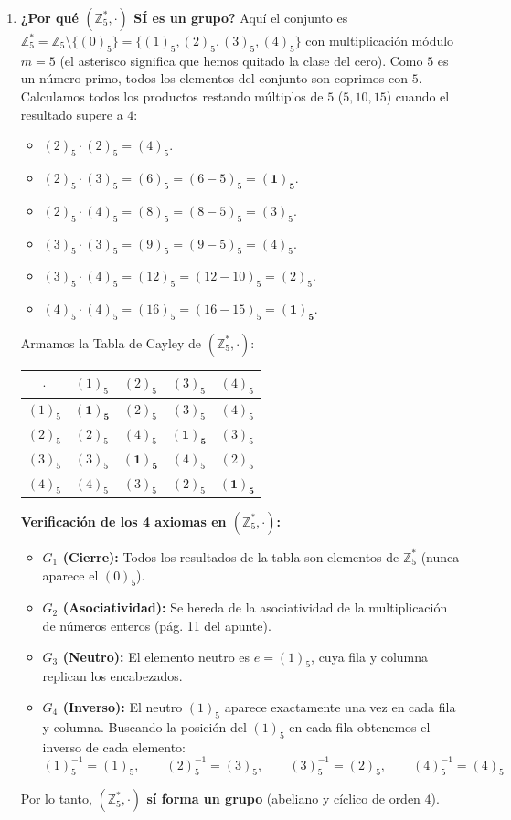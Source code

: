 \documentclass[11pt, a4paper]{article}
\begin{document}
\begin{enumerate}
    \item \textbf{¿Por qué $(\mathbb{Z}_5^*, \cdot)$ SÍ es un grupo?}
    Aquí el conjunto es $\mathbb{Z}_5^* = \mathbb{Z}_5 \setminus \{(0)_5\} = \{(1)_5, (2)_5, (3)_5, (4)_5\}$ con multiplicación módulo $m = 5$ (el asterisco significa que hemos quitado la clase del cero). Como $5$ es un número primo, todos los elementos del conjunto son coprimos con $5$. Calculamos todos los productos restando múltiplos de $5$ ($5, 10, 15$) cuando el resultado supere a $4$:
    \begin{itemize}
        \item $(2)_5 \cdot (2)_5 = (4)_5$.
        \item $(2)_5 \cdot (3)_5 = (6)_5 = (6 - 5)_5 = \mathbf{(1)_5}$.
        \item $(2)_5 \cdot (4)_5 = (8)_5 = (8 - 5)_5 = (3)_5$.
        \item $(3)_5 \cdot (3)_5 = (9)_5 = (9 - 5)_5 = (4)_5$.
        \item $(3)_5 \cdot (4)_5 = (12)_5 = (12 - 10)_5 = (2)_5$.
        \item $(4)_5 \cdot (4)_5 = (16)_5 = (16 - 15)_5 = \mathbf{(1)_5}$.
    \end{itemize}
    Armamos la Tabla de Cayley de $(\mathbb{Z}_5^*, \cdot)$:
    \begin{center}
    \begin{tabular}{c|cccc}
    $\cdot$ & $(1)_5$ & $(2)_5$ & $(3)_5$ & $(4)_5$ \\
    \hline
    $(1)_5$ & $\mathbf{(1)_5}$ & $(2)_5$ & $(3)_5$ & $(4)_5$ \\
    $(2)_5$ & $(2)_5$ & $(4)_5$ & $\mathbf{(1)_5}$ & $(3)_5$ \\
    $(3)_5$ & $(3)_5$ & $\mathbf{(1)_5}$ & $(4)_5$ & $(2)_5$ \\
    $(4)_5$ & $(4)_5$ & $(3)_5$ & $(2)_5$ & $\mathbf{(1)_5}$
    \end{tabular}
    \end{center}
    \textbf{Verificación de los 4 axiomas en $(\mathbb{Z}_5^*, \cdot)$:}
    \begin{itemize}
        \item \textbf{$G_1$ (Cierre):} Todos los resultados de la tabla son elementos de $\mathbb{Z}_5^*$ (nunca aparece el $(0)_5$).
        \item \textbf{$G_2$ (Asociatividad):} Se hereda de la asociatividad de la multiplicación de números enteros (pág. 11 del apunte).
        \item \textbf{$G_3$ (Neutro):} El elemento neutro es $e = (1)_5$, cuya fila y columna replican los encabezados.
        \item \textbf{$G_4$ (Inverso):} El neutro $(1)_5$ aparece exactamente una vez en cada fila y columna. Buscando la posición del $(1)_5$ en cada fila obtenemos el inverso de cada elemento:
        \[
        (1)_5^{-1} = (1)_5, \qquad (2)_5^{-1} = (3)_5, \qquad (3)_5^{-1} = (2)_5, \qquad (4)_5^{-1} = (4)_5
        \]
    \end{itemize}
    Por lo tanto, \textbf{$(\mathbb{Z}_5^*, \cdot)$ sí forma un grupo} (abeliano y cíclico de orden $4$).
\end{enumerate}
\end{document}
